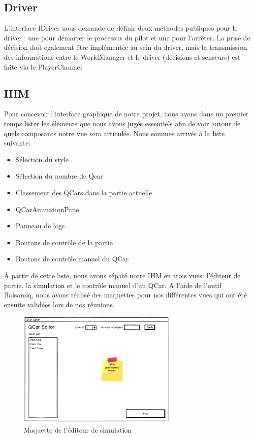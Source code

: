 \documentclass[a4paper, 12pt]{article}
\begin{document}
\subsection{Driver}
L'interface IDriver nous demande de définir deux méthodes publiques pour le driver : une pour démarrer le processus du pilot et une pour l'arrêter. La prise de décision doit également être implémentée au sein du driver, mais la transmission des informations entre le WorldManager et le driver (décisions et senseurs) est faite via le PlayerChannel
\subsection{IHM}
Pour concevoir l'interface graphique de notre projet, nous avons dans un premier temps lister les éléments que nous avons jugés essentiels afin de voir autour de quels composants notre vue sera articulée. Nous sommes arrivés à la liste suivante:
\begin{itemize}
  \item Sélection du style
  \item Sélection du nombre de Qcar
  \item Classement des QCars dans la partie actuelle
  \item QCarAnimationPane
  \item Panneau de logs
  \item Boutons de contrôle de la partie
  \item Boutons de contrôle manuel du QCar
\end{itemize}
À partir de cette liste, nous avons séparé notre IHM en trois vues: l'éditeur de partie, la simulation et le contrôle manuel d'un QCar. A l'aide de l'outil Balsamiq, nous avons réalisé des maquettes pour nos différentes vues qui ont été ensuite validées lors de nos réunions.
\begin{figure}[H]
 \centering
 \includegraphics[width=0.7\textwidth]{includes/images/mockupeditor}
 \caption{\label{fig:maquette_editeur}Maquette de l'éditeur de simulation}
\end{figure}
\end{document}
